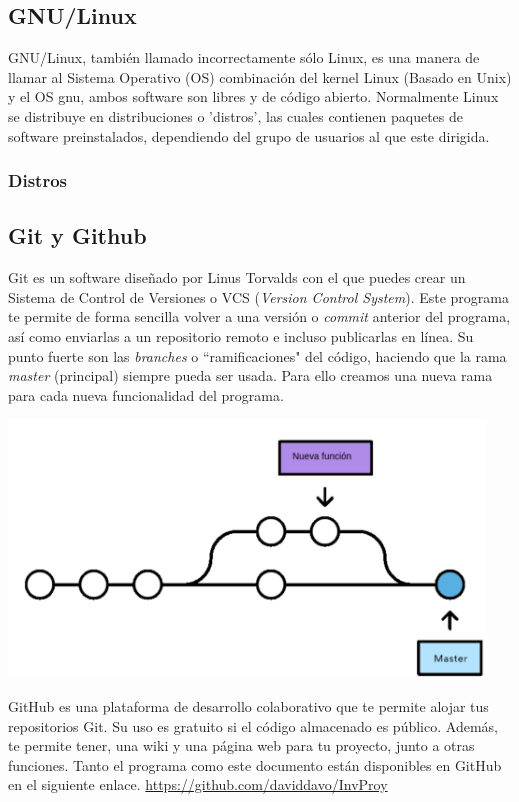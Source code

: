 \documentclass[a4paper, 11pt, twoside]{report} %
\begin{document}
\subsection{GNU/Linux}
GNU/Linux, también llamado incorrectamente sólo Linux, es una manera de llamar al Sistema Operativo (OS) combinación del kernel Linux (Basado en Unix) y el OS \gls{gnu}, ambos software son libres y de código abierto. Normalmente Linux se distribuye en distribuciones o 'distros', las cuales contienen paquetes de software preinstalados, dependiendo del grupo de usuarios al que este dirigida.

\subsubsection*{Distros}

\subsection{Git y Github}
Git es un software diseñado por Linus Torvalds con el que puedes crear un Sistema de Control de Versiones o VCS (\textit{Version Control System}). Este programa te permite de forma sencilla volver a una versión o \textit{commit} anterior del programa, así como enviarlas a un repositorio remoto e incluso publicarlas en línea. Su punto fuerte son las \textit{branches} o ``ramificaciones" del código, haciendo que la rama \textit{master} (principal) siempre pueda ser usada. Para ello creamos una nueva rama para cada nueva funcionalidad del programa.

\includegraphics[width=0.95\textwidth]{Resources/01.01.02-01.png}

GitHub es una plataforma de desarrollo colaborativo que te permite alojar tus repositorios Git. Su uso es gratuito si el código almacenado es público. Además, te permite tener, una wiki y una página web para tu proyecto, junto a otras funciones.
Tanto el programa como este documento están disponibles en GitHub en el siguiente enlace. \url{https://github.com/daviddavo/InvProy}
\end{document}
